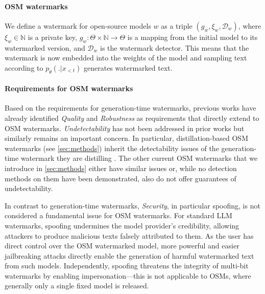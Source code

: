 \paragraph{OSM watermarks}
We define a watermark for open-source models $w$ as a triple $(g_w, \xi_w, \mathcal{D}_w)$, where $\xi_w \in \mathbb{N}$ is a private key, $g_w: \Theta \times \mathbb{N} \rightarrow \Theta$ is a mapping from the initial model to its watermarked version, and $\mathcal{D}_w$ is the watermark detector.
This means that the watermark is now embedded into the weights of the model and sampling text according to $p_{\theta}(.|x_{<t})$ generates watermarked text.

\paragraph{Requirements for OSM watermarks}
Based on the requirements for generation-time watermarks, previous works have already identified \textit{Quality} and \textit{Robustness} as requirements that directly extend to OSM watermarks.  
\textit{Undetectability} has not been addressed in prior works but similarly remains an important concern. 
In particular, distillation-based OSM watermarks (see \cref{sec:methods}) inherit the detectability issues of the generation-time watermark they are distilling \citep{detection,crafted_prompt}.
The other current OSM watermarks that we introduce in \cref{sec:methods} either have similar issues or, while no detection methods on them have been demonstrated, also do not offer guarantees of undetectability.

In contrast to generation-time watermarks, \textit{Security}, in particular spoofing, is not considered a fundamental issue for OSM watermarks.
For standard LLM watermarks, spoofing undermines the model provider's credibility, allowing attackers to produce malicious texts falsely attributed to them. As the user has direct control over the OSM watermarked model, more powerful and easier jailbreaking attacks \citep{prefill_jailbreak} directly enable the generation of harmful watermarked text from such models. 
Independently, spoofing threatens the integrity of multi-bit watermarks \citep{multibit1,multibit2,multibit3} by enabling impersonation---this is not applicable to OSMs, where generally only a single fixed model is released. 


